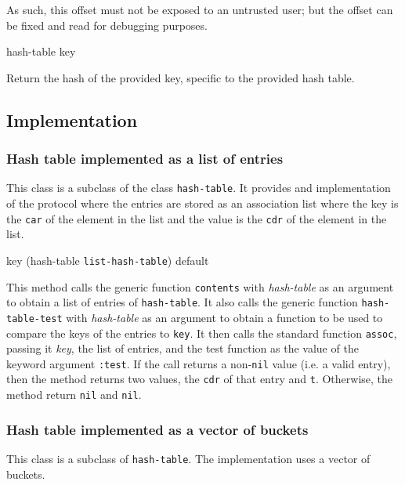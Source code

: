 As such, this offset must not be exposed to an untrusted user; but the
offset can be fixed and read for debugging purposes.

 {hash-table key}

Return the hash of the provided key, specific to the provided hash table.

\subsection{Implementation}

\subsubsection{Hash table implemented as a list of entries}


This class is a subclass of the class \texttt{hash-table}.
It provides and implementation of the protocol where the entries are
stored as an association list where the key is the \texttt{car} of the
element in the list and the value is the \texttt{cdr} of the element
in the list.

{\small{} {key (hash-table {\tt list-hash-table})
    \optional default}
}

This method calls the generic function \texttt{contents} with
\textit{hash-table} as an argument to obtain a list of entries of
\texttt{hash-table}.  It also calls the generic function
\texttt{hash-table-test} with \textit{hash-table} as an argument to
obtain a function to be used to compare the keys of the entries to
\texttt{key}.  It then calls the standard \commonlisp{} function
\texttt{assoc}, passing it \textit{key}, the list of entries, and the
test function as the value of the keyword argument \texttt{:test}.  If
the call returns a non-\texttt{nil} value (i.e. a valid entry), then
the method returns two values, the \texttt{cdr} of that entry and
\texttt{t}.  Otherwise, the method return \texttt{nil} and
\texttt{nil}.

\subsubsection{Hash table implemented as a vector of buckets}


This class is a subclass of \texttt{hash-table}.  The implementation
uses a vector of buckets.

